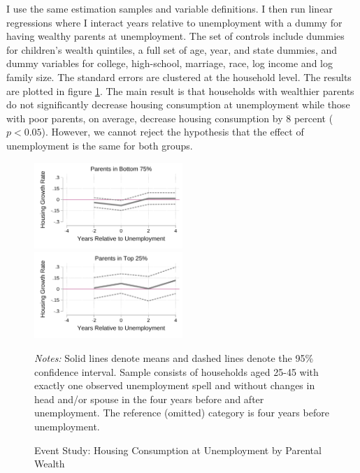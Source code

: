 \documentclass[12pt]{article}
\begin{document}
I use the same estimation samples and variable definitions. I then run linear regressions where I interact years relative to unemployment with a dummy for having wealthy parents at unemployment. The set of controls include dummies for children's wealth quintiles, a full set of age, year, and state dummies, and dummy variables for college, high-school, marriage, race, log income and log family size. The standard errors are clustered at the household level. The results are plotted in figure \ref{fig:housinggrowthrates_controls}. The main result is that households with wealthier parents do not significantly decrease housing consumption at unemployment while those with poor parents, on average, decrease housing consumption by 8 percent ($p<0.05$). However, we cannot reject the hypothesis that the effect of unemployment is the same for both groups.
\begin{figure}
	\caption{Event Study: Housing Consumption at Unemployment by Parental Wealth}\label{fig:housinggrowthrates_controls}
	\includegraphics[width=0.5\textwidth]{../tabfig/descr/PSID_housinggrowthpoor_both_controls}%
	\includegraphics[width=0.5\textwidth]{../tabfig/descr/PSID_housinggrowthrich_both_controls}
	
	{\begin{footnotesize} \textit{Notes:} Solid lines denote means and dashed lines denote the 95\% confidence interval. Sample consists of households aged 25-45 with exactly one observed unemployment spell and without changes in head and/or spouse in the four years before and after unemployment. The reference (omitted) category is four years before unemployment. \end{footnotesize}}
\end{figure}
\end{document}
